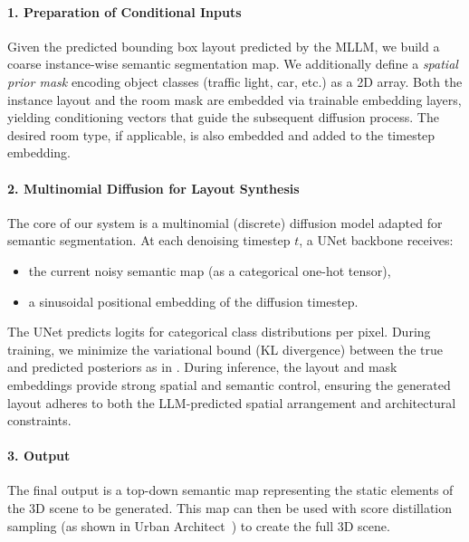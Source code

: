 \documentclass{article}
\begin{document}
\paragraph{1. Preparation of Conditional Inputs}
Given the predicted bounding box layout predicted by the MLLM, we build a coarse instance-wise semantic segmentation map. We additionally define a \textit{spatial prior mask} encoding object classes (traffic light, car, etc.) as a 2D array. Both the instance layout and the room mask are embedded via trainable embedding layers, yielding conditioning vectors that guide the subsequent diffusion process. The desired room type, if applicable, is also embedded and added to the timestep embedding.

\paragraph{2. Multinomial Diffusion for Layout Synthesis}
The core of our system is a multinomial (discrete) diffusion model adapted for semantic segmentation. At each denoising timestep $t$, a UNet backbone receives:
\begin{itemize}
    \item the current noisy semantic map (as a categorical one-hot tensor),
    \item a sinusoidal positional embedding of the diffusion timestep.
\end{itemize}

The UNet predicts logits for categorical class distributions per pixel. During training, we minimize the variational bound (KL divergence) between the true and predicted posteriors as in \cite{hoogeboom2021argmax}. During inference, the layout and mask embeddings provide strong spatial and semantic control, ensuring the generated layout adheres to both the LLM-predicted spatial arrangement and architectural constraints.

\paragraph{3. Output}
The final output is a top-down semantic map representing the static elements of the 3D scene to be generated. This map can then be used with score distillation sampling (as shown in Urban Architect~\cite{lu2024urban}) to create the full 3D scene.
\end{document}
